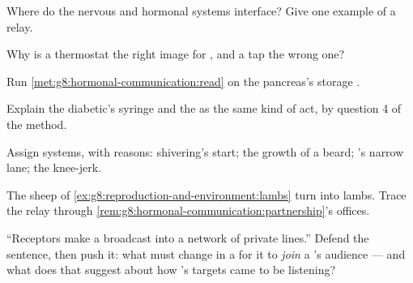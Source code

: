 \begin{exercise}[$\star$]\label{exo:g8:hormonal-communication:6}
Where do the nervous and hormonal systems interface?
Give one example of a relay.
\end{exercise}

\begin{exercise}[$\star\star$]\label{exo:g8:hormonal-communication:7}
Why is a thermostat the right image for , and a
tap the wrong one?
\end{exercise}

\begin{exercise}[$\star\star$]\label{exo:g8:hormonal-communication:8}
Run \cref{met:g8:hormonal-communication:read} on the
pancreas's storage .
\end{exercise}

\begin{exercise}[$\star\star$]\label{exo:g8:hormonal-communication:9}
Explain the diabetic's syringe and the  as the same kind of act, by question 4 of the
method.
\end{exercise}

\begin{exercise}[$\star\star$]\label{exo:g8:hormonal-communication:10}
Assign systems, with reasons: shivering's start; the
growth of a beard;  's narrow lane; the
knee-jerk.
\end{exercise}

\begin{exercise}[$\star\star$]\label{exo:g8:hormonal-communication:11}
The sheep of \cref{ex:g8:reproduction-and-environment:lambs}
turn  into lambs. Trace the relay through
\cref{rem:g8:hormonal-communication:partnership}'s
offices.
\end{exercise}

\begin{exercise}[$\star\star\star$]\label{exo:g8:hormonal-communication:12}
``Receptors make a broadcast into a network of private
lines.'' Defend the sentence, then push it: what must
change in a  for it to \emph{join} a 's
audience --- and what does that suggest about how
's targets came to be listening?
\end{exercise}


